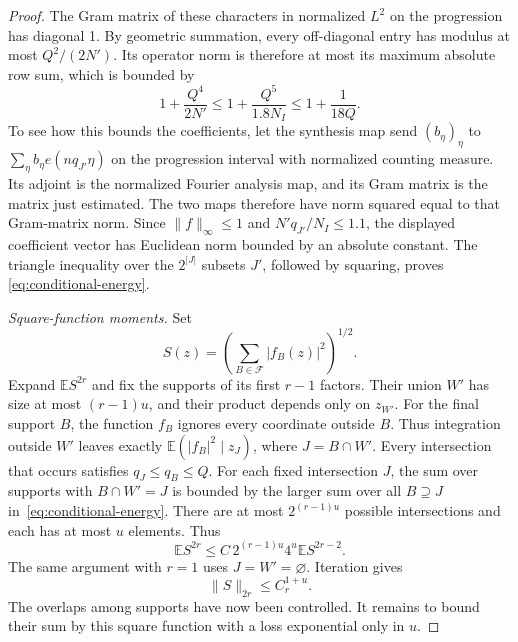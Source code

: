 \begin{proof}
The Gram matrix of these characters in normalized \(L^2\) on the
progression has diagonal 1.  By geometric summation, every off-diagonal
entry has modulus at most \(Q^2/(2N')\).  Its operator norm is
therefore at most its maximum absolute row sum, which is bounded by
\[
 1+\frac{Q^4}{2N'}
 \le1+\frac{Q^5}{1.8N_I}
 \le1+\frac1{18Q}.
\]
To see how this bounds the coefficients, let the synthesis map send
\((b_\eta)_\eta\) to \(\sum_\eta b_\eta e(nq_{J'}\eta)\)
on the progression interval with normalized counting measure.  Its
adjoint is the normalized Fourier analysis map, and its Gram matrix
is the matrix just estimated.  The two maps therefore have norm squared
equal to that Gram-matrix norm.  Since \(\|f\|_\infty\le1\) and
\(N'q_{J'}/N_I\le1.1\), the displayed coefficient vector has
Euclidean norm bounded by an absolute constant.  The triangle inequality
over the \(2^{|J|}\) subsets \(J'\), followed by squaring, proves
\eqref{eq:conditional-energy}.

\smallskip
\noindent\emph{Square-function moments.}
Set
\[
 S(z)=\left(\sum_{B\in\mathcal F}|f_B(z)|^2\right)^{1/2}.
\]
Expand \(\mathbb E S^{2r}\) and fix the supports of its first \(r-1\)
factors.  Their union \(W'\) has size at most \((r-1)u\), and their
product depends only on \(z_{W'}\).  For the final support \(B\),
the function \(f_B\) ignores every coordinate outside \(B\).  Thus
integration outside \(W'\) leaves exactly
\(\mathbb E(|f_B|^2\mid z_J)\), where \(J=B\cap W'\).
Every intersection that occurs satisfies \(q_J\le q_B\le Q\).
For each fixed intersection \(J\), the sum over supports with
\(B\cap W'=J\) is bounded by the larger sum over all \(B\supseteq J\)
in~\eqref{eq:conditional-energy}.  There are at most \(2^{(r-1)u}\) possible
intersections and each has at most \(u\) elements.  Thus
\[
 \mathbb E S^{2r}\le C\,2^{(r-1)u}4^u\mathbb E S^{2r-2}.
\]
The same argument with \(r=1\) uses \(J=W'=\varnothing\).
Iteration gives
\begin{equation}
 \|S\|_{2r}\le C_r^{1+u}.
 \label{eq:lift-square-function}
\end{equation}
The overlaps among supports have now been controlled.  It remains to
bound their sum by this square function with a loss exponential only in
\(u\).


\end{proof}
